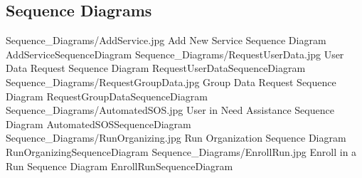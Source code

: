 \documentclass[../../../rasd.tex]{subfiles}
\begin{document}
\subsection{Sequence Diagrams}
\image {13cm} {Sequence_Diagrams/AddService.jpg} {Add New Service Sequence Diagram} {AddServiceSequenceDiagram}
\image {13cm} {Sequence_Diagrams/RequestUserData.jpg} {User Data Request Sequence Diagram} {RequestUserDataSequenceDiagram}
\image {13cm} {Sequence_Diagrams/RequestGroupData.jpg} {Group Data Request Sequence Diagram} {RequestGroupDataSequenceDiagram}
\image {13cm} {Sequence_Diagrams/AutomatedSOS.jpg} {User in Need Assistance Sequence Diagram} {AutomatedSOSSequenceDiagram}
\image {13cm} {Sequence_Diagrams/RunOrganizing.jpg} {Run Organization Sequence Diagram} {RunOrganizingSequenceDiagram}
\image {13cm} {Sequence_Diagrams/EnrollRun.jpg} {Enroll in a Run Sequence Diagram} {EnrollRunSequenceDiagram}
\end{document}
